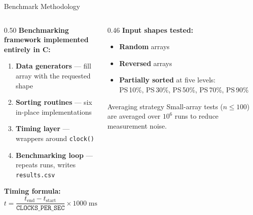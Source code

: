 \documentclass[aspectratio=169]{beamer}
\begin{document}
\begin{frame}{Benchmark Methodology}
  \begin{columns}[T]
    \begin{column}{0.50\textwidth}
      \textbf{Benchmarking framework implemented entirely in C:}
      \begin{enumerate}
        \item \textbf{Data generators} --- fill array with the requested shape
        \item \textbf{Sorting routines} --- six in-place implementations
        \item \textbf{Timing layer} --- wrappers around \texttt{clock()}
        \item \textbf{Benchmarking loop} --- repeats runs, writes \texttt{results.csv}
      \end{enumerate}
      \vspace{0.5em}
      \textbf{Timing formula:}
      \[
        t = \frac{t_{\mathrm{end}} - t_{\mathrm{start}}}{\texttt{CLOCKS\_PER\_SEC}}
            \times 1000 \;\mathrm{ms}
      \]
    \end{column}
    \begin{column}{0.46\textwidth}
      \textbf{Input shapes tested:}
      \begin{itemize}
        \item \textbf{Random} arrays
        \item \textbf{Reversed} arrays
        \item \textbf{Partially sorted} at five levels:\\
              PS\,10\%, PS\,30\%, PS\,50\%, PS\,70\%, PS\,90\%
      \end{itemize}
      \vspace{0.5em}
      \begin{block}{Averaging strategy}
        Small-array tests ($n \leq 100$) are averaged over $10^6$ runs to
        reduce measurement noise.
      \end{block}
    \end{column}
  \end{columns}
\end{frame}
\end{document}
